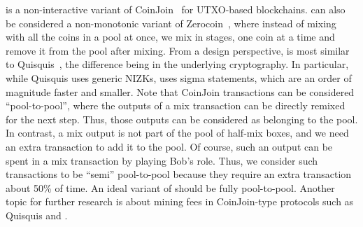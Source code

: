 \documentclass[runningheads]{llncs}
\newcommand{\zerocoin}{Zerocoin\xspace}
\begin{document}
\algname is a non-interactive variant of CoinJoin~\cite{coinjoin} for UTXO-based blockchains. 
\algname can also be considered a non-monotonic variant of \zerocoin~\cite{zerocoin}, where instead of mixing with all the coins in a pool at once, we mix in stages, one coin at a time and remove it from the pool after mixing. 
From a design perspective, \algname is most similar to Quisquis~\cite{quisquis}, the difference being in the underlying cryptography. In particular, while Quisquis uses
generic NIZKs, \algname uses sigma statements, which are an order of magnitude faster and smaller. Note that CoinJoin transactions can be considered ``pool-to-pool'', where
the outputs of a mix transaction can be directly remixed for the next step. Thus, those outputs can be considered as belonging to the pool. In contrast, a \algname mix output
is not part of the pool of half-mix boxes, and we need an extra transaction to add it to the pool. 
Of course, such an output can be spent in a mix transaction by playing Bob's role. Thus, we consider such transactions to be ``semi'' pool-to-pool because they require an extra transaction about 50\% of time. An ideal variant of \algname should be fully pool-to-pool. Another topic for further research is about mining fees in CoinJoin-type protocols such as Quisquis and \algname.




\end{document}
